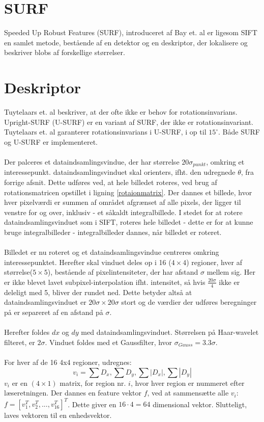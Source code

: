 \section{SURF}
Speeded Up Robust Features (SURF), introduceret af Bay et. al \cite{SURF} er ligesom SIFT en samlet metode, bestående af en detektor og en deskriptor, der lokalisere og beskriver blobs af forskellige størrelser.



\section{Deskriptor}
Tuytelaars et. al \cite{SURF} beskriver, at der ofte ikke er behov for rotationsinvarians. Upright-SURF (U-SURF) er en variant af SURF, der ikke er rotationsinvariant. Tuytelaars et. al garanterer rotationsinvarians i U-SURF, i op til $15^{\circ}$. Både SURF og U-SURF er implementeret.
\\
\\
Der palceres et dataindsamlingsvindue, der har størrelse $20 \sigma_{punkt}$, omkring et interessepunkt. dataindsamlingsvinduet skal orienters, ifht. den udregnede $\theta$, fra forrige afsnit. Dette udføres ved, at hele billedet roteres, ved brug af rotationsmatricen opstillet i ligning \eqref{rotaionmatrix}. Der dannes et billede, hvor hver pixelværdi er summen af området afgrænset af alle pixels, der ligger til venstre for og over, inklusiv - et såkaldt integralbillede. I stedet for at rotere dataindsamlingsvinduet som i SIFT, roteres hele billedet - dette er for at kunne bruge integralbilleder - integralbilleder dannes, når billedet er roteret.
\\
\\
Billedet er nu roteret og et dataindsamlingsvindue centreres omkring interessepunktet. Herefter skal vinduet deles op i 16 ($4 \times 4$) regioner, hver af størrelse($5\times 5$), bestående af pixelintensiteter, der har afstand $\sigma$ mellem sig. Her er ikke blevet lavet subpixel-interpolation ifht. intensitet, så hvis $\frac{20\sigma}{4}$ ikke er deleligt med 5, bliver der rundet ned. Dette betyder altså at dataindsamlingsvinduet er $20\sigma \times 20 \sigma$ stort og de værdier der udføres beregninger på er separeret af en afstand på $\sigma$.
\\
\\
Herefter foldes $dx$ og $dy$ med dataindsamlingsvinduet. Størrelsen på Haar-wavelet filteret, er $2\sigma$. Vinduet foldes med et Gaussfilter, hvor $\sigma_{Gauss} = 3.3\sigma$.
\\
\\
For hver af de 16 4x4 regioner, udregnes: 
\begin{equation}
v_i = \sum D_x, \sum D_y, \sum |D_x|, \sum |D_y|
\label{surffeature}
\end{equation}
$v_i$ er en $(4\times 1)$ matrix, for region nr. $i$, hvor hver region er nummeret efter læseretningen. Der dannes en feature vektor $f$, ved at sammensætte alle $v_i$: $f = [v_1^T, v_2^T,..., v_{16}^T]^T$. Dette giver en $16 \cdot 4 = 64$ dimensional vektor. Slutteligt, laves vektoren til en enhedsvektor.
